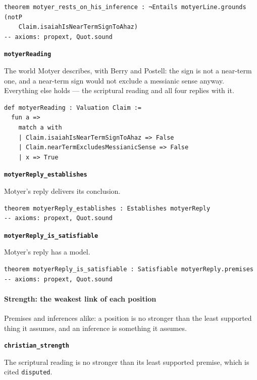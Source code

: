 \documentclass[11pt]{article}
\begin{document}
{\small\begin{verbatim}
theorem motyer_rests_on_his_inference : ¬Entails motyerLine.grounds (notP
    Claim.isaiahIsNearTermSignToAhaz)
-- axioms: propext, Quot.sound
\end{verbatim}}
\par\medskip\noindent\textbf{\texttt{motyer\allowbreak{}Reading}}\par\nobreak\noindent
The world Motyer describes, with Berry and Postell: the sign is not a near-term one, and a near-term sign would not exclude a messianic sense anyway. Everything else holds — the scriptural reading and all four replies with it.

{\small\begin{verbatim}
def motyerReading : Valuation Claim :=
  fun a =>
    match a with
    | Claim.isaiahIsNearTermSignToAhaz => False
    | Claim.nearTermExcludesMessianicSense => False
    | x => True
\end{verbatim}}
\par\medskip\noindent\textbf{\texttt{motyer\allowbreak{}Reply\_\allowbreak{}establishes}}\par\nobreak\noindent
Motyer's reply delivers its conclusion.

{\small\begin{verbatim}
theorem motyerReply_establishes : Establishes motyerReply
-- axioms: propext, Quot.sound
\end{verbatim}}
\par\medskip\noindent\textbf{\texttt{motyer\allowbreak{}Reply\_\allowbreak{}is\_\allowbreak{}satisfiable}}\par\nobreak\noindent
Motyer's reply has a model.

{\small\begin{verbatim}
theorem motyerReply_is_satisfiable : Satisfiable motyerReply.premises
-- axioms: propext, Quot.sound
\end{verbatim}}
\paragraph*{Strength: the weakest link of each position}
\leavevmode\par
Premises and inferences alike: a position is no stronger than the least supported thing it assumes, and an inference is something it assumes.

\par\medskip\noindent\textbf{\texttt{christian\_\allowbreak{}strength}}\par\nobreak\noindent
The scriptural reading is no stronger than its least supported premise, which is cited \texttt{disputed}.
\end{document}
